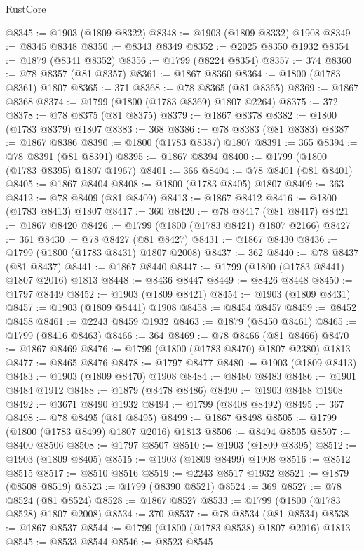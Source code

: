 \begin{lexlean}{RustCore}
\begin{coremodule}
@8345 := @1903 (@1809 @8322)
@8348 := @1903 (@1809 @8332) @1908
@8349 := @8345 @8348
@8350 := @8343 @8349
@8352 := @2025 @8350 @1932
@8354 := @1879 (@8341 @8352)
@8356 := @1799 (@8224 @8354)
@8357 := 374
@8360 := @78 @8357 (@81 @8357)
@8361 := @1867 @8360
@8364 := @1800 (@1783 @8361) @1807
@8365 := 371
@8368 := @78 @8365 (@81 @8365)
@8369 := @1867 @8368
@8374 := @1799 (@1800 (@1783 @8369) @1807 @2264)
@8375 := 372
@8378 := @78 @8375 (@81 @8375)
@8379 := @1867 @8378
@8382 := @1800 (@1783 @8379) @1807
@8383 := 368
@8386 := @78 @8383 (@81 @8383)
@8387 := @1867 @8386
@8390 := @1800 (@1783 @8387) @1807
@8391 := 365
@8394 := @78 @8391 (@81 @8391)
@8395 := @1867 @8394
@8400 := @1799 (@1800 (@1783 @8395) @1807 @1967)
@8401 := 366
@8404 := @78 @8401 (@81 @8401)
@8405 := @1867 @8404
@8408 := @1800 (@1783 @8405) @1807
@8409 := 363
@8412 := @78 @8409 (@81 @8409)
@8413 := @1867 @8412
@8416 := @1800 (@1783 @8413) @1807
@8417 := 360
@8420 := @78 @8417 (@81 @8417)
@8421 := @1867 @8420
@8426 := @1799 (@1800 (@1783 @8421) @1807 @2166)
@8427 := 361
@8430 := @78 @8427 (@81 @8427)
@8431 := @1867 @8430
@8436 := @1799 (@1800 (@1783 @8431) @1807 @2008)
@8437 := 362
@8440 := @78 @8437 (@81 @8437)
@8441 := @1867 @8440
@8447 := @1799 (@1800 (@1783 @8441) @1807 @2016) @1813
@8448 := @8436 @8447
@8449 := @8426 @8448
@8450 := @1797 @8449
@8452 := @1903 (@1809 @8421)
@8454 := @1903 (@1809 @8431)
@8457 := @1903 (@1809 @8441) @1908
@8458 := @8454 @8457
@8459 := @8452 @8458
@8461 := @2243 @8459 @1932
@8463 := @1879 (@8450 @8461)
@8465 := @1799 (@8416 @8463)
@8466 := 364
@8469 := @78 @8466 (@81 @8466)
@8470 := @1867 @8469
@8476 := @1799 (@1800 (@1783 @8470) @1807 @2380) @1813
@8477 := @8465 @8476
@8478 := @1797 @8477
@8480 := @1903 (@1809 @8413)
@8483 := @1903 (@1809 @8470) @1908
@8484 := @8480 @8483
@8486 := @1901 @8484 @1912
@8488 := @1879 (@8478 @8486)
@8490 := @1903 @8488 @1908
@8492 := @3671 @8490 @1932
@8494 := @1799 (@8408 @8492)
@8495 := 367
@8498 := @78 @8495 (@81 @8495)
@8499 := @1867 @8498
@8505 := @1799 (@1800 (@1783 @8499) @1807 @2016) @1813
@8506 := @8494 @8505
@8507 := @8400 @8506
@8508 := @1797 @8507
@8510 := @1903 (@1809 @8395)
@8512 := @1903 (@1809 @8405)
@8515 := @1903 (@1809 @8499) @1908
@8516 := @8512 @8515
@8517 := @8510 @8516
@8519 := @2243 @8517 @1932
@8521 := @1879 (@8508 @8519)
@8523 := @1799 (@8390 @8521)
@8524 := 369
@8527 := @78 @8524 (@81 @8524)
@8528 := @1867 @8527
@8533 := @1799 (@1800 (@1783 @8528) @1807 @2008)
@8534 := 370
@8537 := @78 @8534 (@81 @8534)
@8538 := @1867 @8537
@8544 := @1799 (@1800 (@1783 @8538) @1807 @2016) @1813
@8545 := @8533 @8544
@8546 := @8523 @8545

\end{coremodule}
\end{lexlean}
